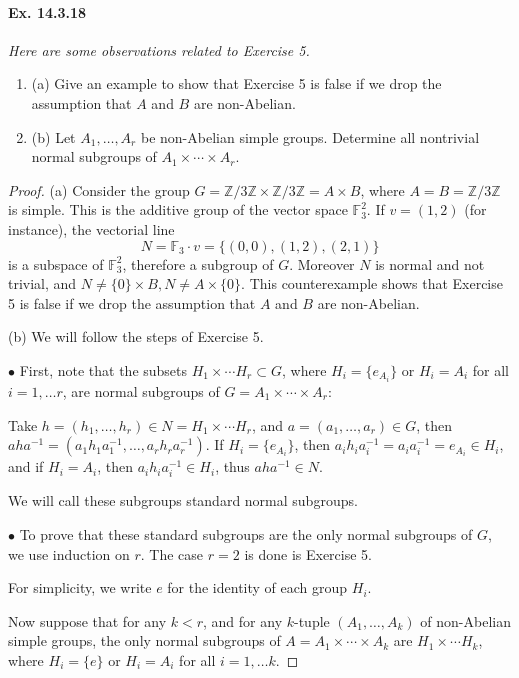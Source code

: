 \documentclass[11pt,a4paper]{article}
\newcommand{\be} {\begin{enumerate}}
\newcommand{\ee} {\end{enumerate}}
\newcommand{\Z}{\mathbb{Z}}
\newcommand{\F}{\mathbb{F}}
\begin{document}
 \paragraph{Ex. 14.3.18}{\it Here are some observations related to Exercise 5.
 \be
 \item[(a)] Give an example to show that Exercise 5 is false if we drop the assumption that $A$ and $B$ are non-Abelian.
 \item[(b)] Let $A_1,\ldots,A_r$ be non-Abelian simple groups. Determine all nontrivial normal subgroups of $A_1\times\cdots\times A_r$.
 \ee
}
\begin{proof}
\item[(a)] Consider the group $G = \Z/3\Z \times \Z/3\Z = A \times B$, where $A = B = \Z/3\Z$ is simple. This is the additive group of the vector space $\F_3^2$. If $v = (1,2)$ (for instance), the vectorial line 
$$N = \F_3\cdot v = \{(0,0), (1,2),(2,1)\}$$
 is a subspace of $\F_3^2$, therefore a subgroup  of $G$. Moreover $N$ is normal and not trivial, and $N \ne \{0\} \times B , N\ne A \times \{0\}$. This counterexample shows that Exercise 5 is false if we drop the assumption that $A$ and $B$ are non-Abelian.
\item[(b)] We will follow the steps of Exercise 5.

\item[$\bullet$]  First, note that the subsets $H_1\times \cdots H_r \subset G$, where $H_i = \{e_{A_i}\}$ or $H_i = A_i$ for all $i = 1,\ldots r$, are normal subgroups of $G = A_1\times\cdots \times A_{r}$:

Take $h = (h_1,\ldots,h_r) \in N = H_1\times \cdots H_r$, and $a= (a_1,\ldots,a_r) \in G$, then $a h a^{-1} = (a_1h_1a_1^{-1},\ldots,a_rh_ra_r^{-1})$. If $H_i = \{e_{A_i}\}$, then $a_i h_i a_i^{-1} = a_i a_i^{-1} = e_{A_i}\in H_i$, and if $H_i = A_i$, then $a_i h_i a_i^{-1} \in H_i$, thus $a h a^{-1} \in N$.

We will call these subgroups standard normal subgroups.

\item[$\bullet$]  To prove that these standard subgroups are the only normal subgroups of $G$, we use induction on $r$. The case $r=2$ is done is Exercise 5.

For simplicity, we write $e$ for the identity of each group $H_i$.

Now suppose that for any $k<r$, and for any $k$-tuple $(A_1,\ldots,A_k)$ of non-Abelian simple groups, the only normal subgroups of $A = A_1 \times \cdots \times A_k$ are $H_1\times \cdots H_k$, where $H_i = \{e\}$ or $H_i = A_i$ for all $i = 1,\ldots k$. 


\end{proof}
\end{document}
